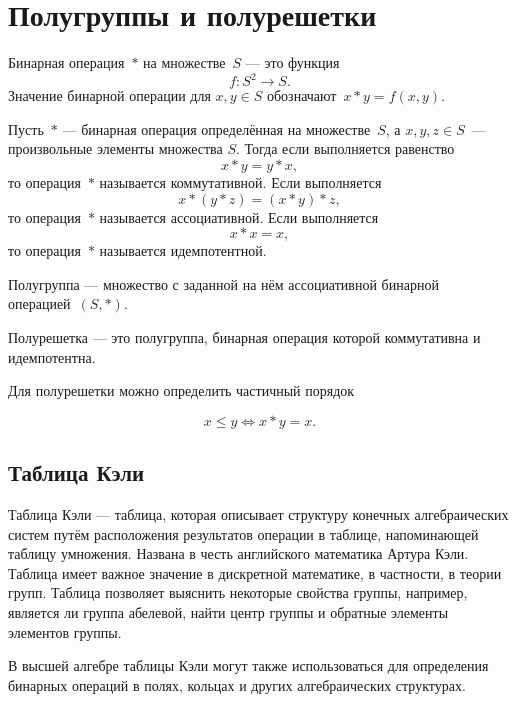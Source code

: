 \chapter{Полугруппы и полурешетки}

\begin{my_def}
Бинарная операция~$*$ на множестве~$S$ --- это функция
$$f: S^2 \rightarrow S.$$
Значение бинарной операции для $x, y \in S$ обозначают~$x * y = f(x, y)$.
\end{my_def}


\begin{my_def}
Пусть~$*$ --- бинарная операция определённая на множестве~$S$, а
$x, y, z \in S$~--- произвольные элементы множества $S$. Тогда если
выполняется равенство
$$x * y = y * x,$$
то операция~$*$ называется коммутативной.
Если выполняется
$$
x * (y * z) = (x * y) * z,
$$
то операция~$*$ называется ассоциативной.
Если выполняется
$$
x * x = x,
$$
то операция~$*$ называется идемпотентной.
\end{my_def}


\begin{my_def}
Полугруппа --- множество с заданной на нём ассоциативной бинарной операцией~$(S,*)$.
\end{my_def}


\begin{my_def}
Полурешетка --- это полугруппа, бинарная операция которой коммутативна и
идемпотентна.
\end{my_def}

Для полурешетки можно определить частичный порядок

$$x \leq y \Leftrightarrow x*y=x.$$

\section{Таблица Кэли}

Таблица Кэли --- таблица, которая описывает структуру конечных алгебраических систем путём расположения результатов операции в таблице, напоминающей таблицу умножения. Названа в честь английского математика Артура Кэли. Таблица имеет важное значение в дискретной математике, в частности, в теории групп. Таблица позволяет выяснить некоторые свойства группы, например, является ли группа абелевой, найти центр группы и обратные элементы элементов группы.

В высшей алгебре таблицы Кэли могут также использоваться для определения бинарных операций в полях, кольцах и других алгебраических структурах.

